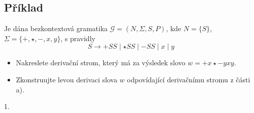\subsection{Příklad} %
Je dána bezkontextová gramatika $\mathcal{G} = (N, \Sigma, S, P)$, kde $N = \{S\}$, $\Sigma = \{+, \star, -, x, y\}$, 
s pravidly 
$$S \rightarrow +SS \mid \star SS \mid -SS \mid x \mid y $$ 

\begin{itemize}[noitemsep]
    \item Nakreslete derivační strom, který má za výsledek slovo $ w = + x \star - y x y$.  
    \item Zkonstruujte levou derivaci slova $w$ odpovídající derivačnímu stromu z části a).
\end{itemize}

1. 

